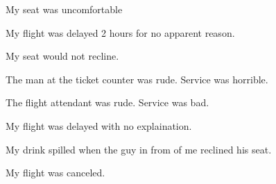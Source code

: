 \documentclass{report}
\begin{document}
\noindent My seat was uncomfortable
\vspace{2mm}

\noindent My flight was delayed 2 hours for no apparent reason.
\vspace{2mm}

\noindent My seat would not recline.
\vspace{2mm}

\noindent The man at the ticket counter was rude. Service was horrible.
\vspace{2mm}

\noindent The flight attendant was rude. Service was bad.
\vspace{2mm}

\noindent My flight was delayed with no explaination.
\vspace{2mm}

\noindent My drink spilled when the guy in from of me reclined his seat.
\vspace{2mm}

\noindent My flight was canceled.
\vspace{2mm}
\end{document}
